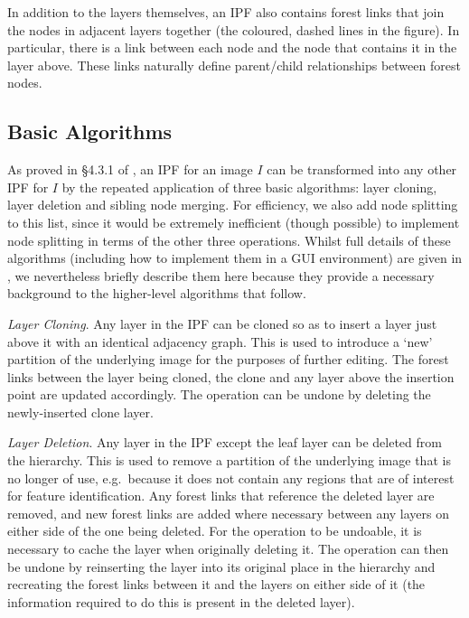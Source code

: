 \documentclass[10pt,twocolumn,twoside]{IEEEtran}
\begin{document}
In addition to the layers themselves, an IPF also contains forest links that join the nodes in adjacent layers together (the coloured, dashed lines in the figure). In particular, there is a link between each node and the node that contains it in the layer above. These links naturally define parent/child relationships between forest nodes.

\subsection{Basic Algorithms}

As proved in \S4.3.1 of \cite{golodetz11}, an IPF for an image $I$ can be transformed into any other IPF for $I$ by the repeated application of three basic algorithms: layer cloning, layer deletion and sibling node merging. For efficiency, we also add node splitting to this list, since it would be extremely inefficient (though possible) to implement node splitting in terms of the other three operations. Whilst full details of these algorithms (including how to implement them in a GUI environment) are given in \cite{golodetz11}, we nevertheless briefly describe them here because they provide a necessary background to the higher-level algorithms that follow.

\emph{Layer Cloning}. Any layer in the IPF can be cloned so as to insert a layer just above it with an identical adjacency graph. This is used to introduce a `new' partition of the underlying image for the purposes of further editing. The forest links between the layer being cloned, the clone and any layer above the insertion point are updated accordingly. The operation can be undone by deleting the newly-inserted clone layer.

\emph{Layer Deletion}. Any layer in the IPF except the leaf layer can be deleted from the hierarchy. This is used to remove a partition of the underlying image that is no longer of use, e.g.~because it does not contain any regions that are of interest for feature identification. Any forest links that reference the deleted layer are removed, and new forest links are added where necessary between any layers on either side of the one being deleted. For the operation to be undoable, it is necessary to cache the layer when originally deleting it. The operation can then be undone by reinserting the layer into its original place in the hierarchy and recreating the forest links between it and the layers on either side of it (the information required to do this is present in the deleted layer).
\end{document}

